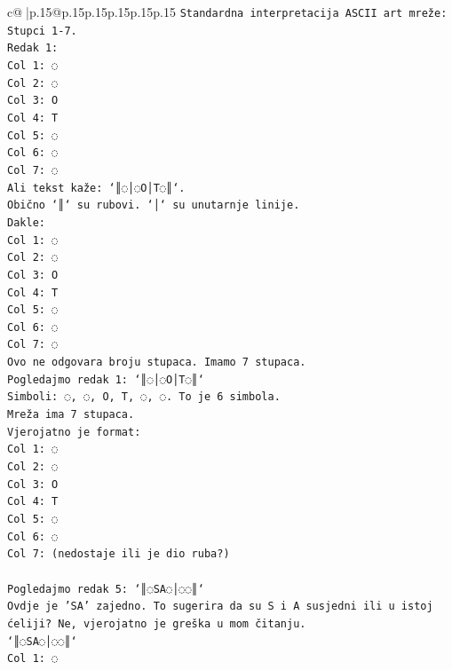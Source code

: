 \documentclass{article}
\begin{document}
{\begin{supertabular}{c@{$\;$}|p{.15\linewidth}@{}p{.15\linewidth}p{.15\linewidth}p{.15\linewidth}p{.15\linewidth}p{.15\linewidth}}
{{{\texttt{Standardna interpretacija ASCII art mreže:} \\
\texttt{Stupci 1{-}7.} \\
\texttt{Redak 1:} \\
\texttt{Col 1: ◌} \\
\texttt{Col 2: ◌} \\
\texttt{Col 3: O} \\
\texttt{Col 4: T} \\
\texttt{Col 5: ◌} \\
\texttt{Col 6: ◌} \\
\texttt{Col 7: ◌} \\
\texttt{Ali tekst kaže: `║◌│◌O│T◌║`.} \\
\texttt{Obično `║` su rubovi. `│` su unutarnje linije.} \\
\texttt{Dakle:} \\
\texttt{Col 1: ◌} \\
\texttt{Col 2: ◌} \\
\texttt{Col 3: O} \\
\texttt{Col 4: T} \\
\texttt{Col 5: ◌} \\
\texttt{Col 6: ◌} \\
\texttt{Col 7: ◌} \\
\texttt{Ovo ne odgovara broju stupaca. Imamo 7 stupaca.} \\
\texttt{Pogledajmo redak 1: `║◌│◌O│T◌║`} \\
\texttt{Simboli: ◌, ◌, O, T, ◌, ◌. To je 6 simbola.} \\
\texttt{Mreža ima 7 stupaca.} \\
\texttt{Vjerojatno je format:} \\
\texttt{Col 1: ◌} \\
\texttt{Col 2: ◌} \\
\texttt{Col 3: O} \\
\texttt{Col 4: T} \\
\texttt{Col 5: ◌} \\
\texttt{Col 6: ◌} \\
\texttt{Col 7: (nedostaje ili je dio ruba?)} \\
\\ 
\texttt{Pogledajmo redak 5: `║◌SA◌│◌◌║`} \\
\texttt{Ovdje je 'SA' zajedno. To sugerira da su S i A susjedni ili u istoj ćeliji? Ne, vjerojatno je greška u mom čitanju.} \\
\texttt{`║◌SA◌│◌◌║`} \\
\texttt{Col 1: ◌} \\
}}}
\end{supertabular}}
\end{document}
